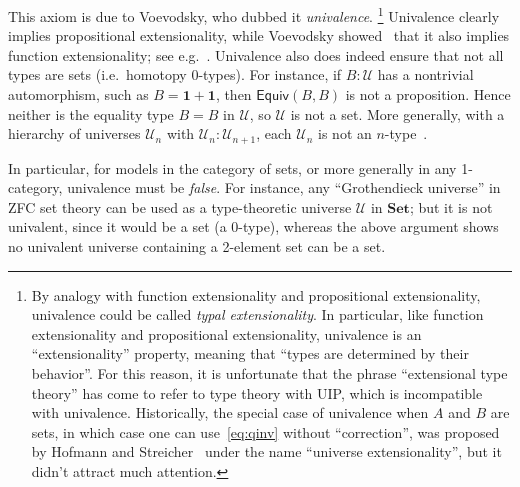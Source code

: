 \documentclass[12pt]{article}
\def\U{\mathscr{U}}
\def\equiv{\mathsf{Equiv}}
\def\unit{\mathbf{1}}
\numberwithin{equation}{section}
\begin{document}
This axiom is due to Voevodsky, who dubbed it \emph{univalence}.%
\footnote{By analogy with function extensionality and propositional extensionality, univalence could be called \emph{typal extensionality}.
  In particular, like function extensionality and propositional extensionality, univalence is an ``extensionality'' property, meaning that ``types are determined by their behavior''.
  For this reason, it is unfortunate that the phrase ``extensional type theory'' has come to refer to type theory with UIP, which is incompatible with univalence.
  Historically, the special case of univalence when $A$ and $B$ are sets, in which case one can use~\eqref{eq:qinv} without ``correction'', was proposed by Hofmann and Streicher~\cite{hs:gpd-typethy} under the name ``universe extensionality'', but it didn't attract much attention.}
Univalence clearly implies propositional extensionality, %
while Voevodsky showed~\cite{vv:unimath} that it also implies function extensionality; see e.g.~\cite[\S4.9]{hottbook}.
Univalence also does indeed ensure that not all types are sets (i.e.\ homotopy 0-types).
For instance, if $B:\U$ has a nontrivial automorphism, such as $B=\unit+\unit$, then $\equiv(B,B)$ is not a proposition.
Hence neither is the equality type $B=B$ in $\U$, so $\U$ is not a set.
More generally, with a hierarchy of universes $\U_n$ with $\U_n : \U_{n+1}$, each $\U_n$ is not an $n$-type~\cite{ks:u-not-ntype}.

In particular, for models in the category of sets, or more generally in any 1-category, univalence must be \emph{false}.
For instance, any ``Grothendieck universe'' in ZFC set theory can be used as a type-theoretic universe $\U$ in $\mathbf{Set}$; but it is not univalent, since it would be a set (a 0-type), whereas the above argument shows no univalent universe containing a 2-element set can be a set.
\end{document}
